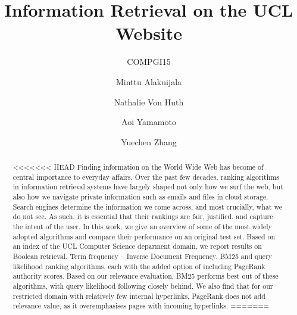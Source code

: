\documentclass[sigconf]{acmart}
\begin{document}
\title{Information Retrieval on the UCL Website}
\subtitle{COMPGI15}


\author{Minttu Alakuijala}
\affiliation{\institution{}}

\author{Nathalie Von Huth}
\affiliation{\institution{}}

\author{Aoi Yamamoto}
\affiliation{\institution{}}

\author{Yuechen Zhang}
\affiliation{\institution{}}



\begin{abstract}
<<<<<<< HEAD
Finding information on the World Wide Web has become of central importance to everyday affairs. Over the past few decades, ranking algorithms in information retrieval systems have largely shaped not only how we surf the web, but also how we navigate private information such as emails and files in cloud storage. Search engines determine the information we come across, and most crucially, what we do not see. As such, it is essential that their rankings are fair, justified, and capture the intent of the user. In this work, we give an overview of some of the most widely adopted algorithms and compare their performance on an original test set. Based on an index of the UCL Computer Science deparment domain, we report results on Boolean retrieval, Term frequency -- Inverse Document Frequency, BM25 and query likelihood ranking algorithms, each with the added option of including PageRank authority scores. Based on our relevance evaluation, BM25 performs best out of these algorithms, with query likelihood following closely behind. We also find that for our restricted domain with relatively few internal hyperlinks, PageRank does not add relevance value, as it overemphasises pages with incoming hyperlinks.
=======

\end{abstract}
\end{document}

